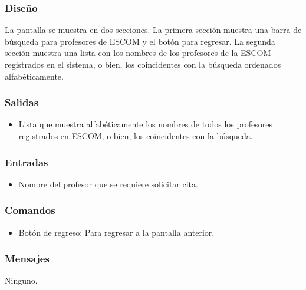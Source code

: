 \subsubsection{Diseño}
	\noindent
	La pantalla se muestra en dos secciones. La primera sección muestra una barra de búsqueda para profesores de ESCOM y el botón para regresar. La segunda sección muestra una lista con los nombres de los profesores de la ESCOM registrados en el sistema, o bien, los coincidentes con la búsqueda ordenados alfabéticamente. 


\subsubsection{Salidas}
	\begin{itemize}
		\item Lista que muestra alfabéticamente los nombres de todos los profesores registrados en ESCOM, o bien, los coincidentes con la búsqueda. 
	\end{itemize}

\subsubsection{Entradas}

\begin{itemize}
		\item Nombre del profesor que se requiere solicitar cita.  
	\end{itemize}

\subsubsection{Comandos}
\begin{itemize}
		\item Botón de regreso: Para regresar a la pantalla anterior. 
	\end{itemize}

\subsubsection{Mensajes}
Ninguno.

